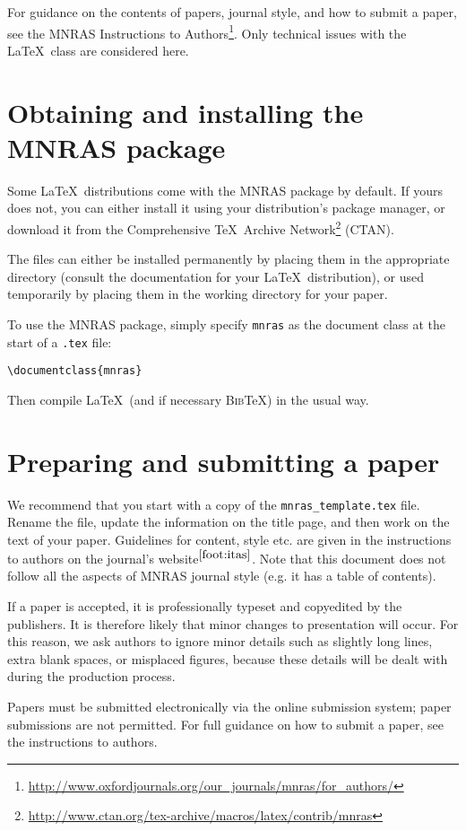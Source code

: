 \documentclass[fleqn,usenatbib,useAMS]{mnras}
\newcommand{\bibtex}{\textsc{Bib}\!\TeX} %
\begin{document}
For guidance on the contents of papers, journal style, and how to submit a paper, see the MNRAS Instructions to Authors\footnote{\label{foot:itas}\url{http://www.oxfordjournals.org/our_journals/mnras/for_authors/}}.
Only technical issues with the \LaTeX\ class are considered here.


\section{Obtaining and installing the MNRAS package}
Some \LaTeX\ distributions come with the MNRAS package by default.
If yours does not, you can either install it using your distribution's package manager, or download it from the Comprehensive \TeX\ Archive Network\footnote{\url{http://www.ctan.org/tex-archive/macros/latex/contrib/mnras}} (CTAN).

The files can either be installed permanently by placing them in the appropriate directory (consult the documentation for your \LaTeX\ distribution), or used temporarily by placing them in the working directory for your paper.

To use the MNRAS package, simply specify \verb'mnras' as the document class at the start of a \verb'.tex' file:

\begin{verbatim}
\documentclass{mnras}
\end{verbatim}
Then compile \LaTeX\ (and if necessary \bibtex) in the usual way.

\section{Preparing and submitting a paper}
We recommend that you start with a copy of the \texttt{mnras\_template.tex} file.
Rename the file, update the information on the title page, and then work on the text of your paper.
Guidelines for content, style etc. are given in the instructions to authors on the journal's website$^{\ref{foot:itas}}$.
Note that this document does not follow all the aspects of MNRAS journal style (e.g. it has a table of contents).

If a paper is accepted, it is professionally typeset and copyedited by the publishers.
It is therefore likely that minor changes to presentation will occur.
For this reason, we ask authors to ignore minor details such as slightly long lines, extra blank spaces, or misplaced figures, because these details will be dealt with during the production process.

Papers must be submitted electronically via the online submission system; paper submissions are not permitted.
For full guidance on how to submit a paper, see the instructions to authors.
\end{document}
